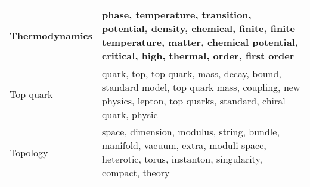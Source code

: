 \begin{longtable}[H]{p{}|p{}}
Thermodynamics                                        &                                          phase, temperature, transition, potential, density, chemical, finite, finite temperature, matter, chemical potential, critical, high, thermal, order, first order \\ \midrule
Top quark                                             &                                                       quark, top, top quark, mass, decay, bound, standard model, top quark mass, coupling, new physics, lepton, top quarks, standard, chiral quark, physic \\ \midrule
Topology                                              &                                                                space, dimension, modulus, string, bundle, manifold, vacuum, extra, moduli space, heterotic, torus, instanton, singularity, compact, theory \\ \midrule
\end{longtable}
